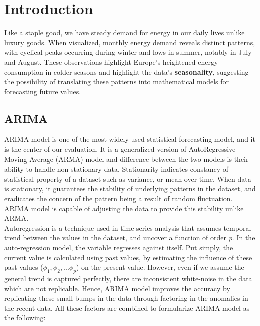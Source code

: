 \documentclass[acmtog]{acmart}
\begin{document}
\maketitle

\section{Introduction}

Like a staple good, we have steady demand for energy in our daily lives unlike luxury goods. When visualized, monthly energy demand reveals distinct patterns, with cyclical peaks occurring during winter and lows in summer, notably in July and August. These observations highlight Europe's heightened energy consumption in colder seasons and highlight the data's \textbf{seasonality}, suggesting the possibility of translating these patterns into mathematical models for forecasting future values.\\ 

\subsection{ARIMA}
ARIMA model is one of the most widely used statistical forecasting model, and it is the center of our evaluation. It is a generalized version of AutoRegressive Moving-Average (ARMA) model and difference between the two models is their ability to handle non-stationary data. Stationarity indicates constancy of statistical property of a dataset such as variance, or mean over time. When data is stationary, it guarantees the stability of underlying patterns in the dataset, and eradicates the concern of the pattern being a result of random fluctuation. ARIMA model is capable of adjusting the data to provide this stability unlike ARMA. \\

Autoregression is a technique used in time series analysis that assumes temporal trend between the values in the dataset, and uncover a function of order \textit{p}. In the auto-regression model, the variable regresses against itself. Put simply, the current value is calculated using past values, by estimating the influence of these past values (${\phi_1, \phi_2, ... \phi_p}$) on the present value. However, even if we assume the general trend is captured perfectly, there are inconsistent white-noise in the data which are not replicable. Hence, ARIMA model improves the accuracy by replicating these small bumps in the data through factoring in the anomalies in the recent data. All these factors are combined to formularize ARIMA model as the following:
\end{document}

